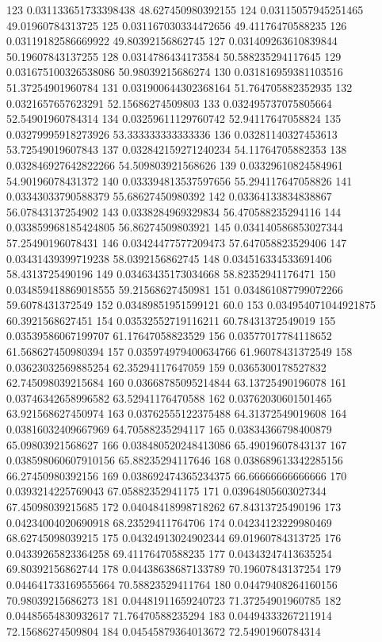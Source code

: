 {123 0.031133651733398438 48.627450980392155
124 0.03115057945251465 49.01960784313725
125 0.031167030334472656 49.41176470588235
126 0.03119182586669922 49.80392156862745
127 0.031409263610839844 50.19607843137255
128 0.0314786434173584 50.588235294117645
129 0.031675100326538086 50.98039215686274
130 0.031816959381103516 51.37254901960784
131 0.031900644302368164 51.764705882352935
132 0.0321657657623291 52.15686274509803
133 0.032495737075805664 52.54901960784314
134 0.03259611129760742 52.94117647058824
135 0.03279995918273926 53.333333333333336
136 0.03281140327453613 53.72549019607843
137 0.032842159271240234 54.11764705882353
138 0.032846927642822266 54.509803921568626
139 0.03329610824584961 54.90196078431372
140 0.033394813537597656 55.294117647058826
141 0.03343033790588379 55.68627450980392
142 0.03364133834838867 56.07843137254902
143 0.0338284969329834 56.470588235294116
144 0.033859968185424805 56.86274509803921
145 0.034140586853027344 57.25490196078431
146 0.03424477577209473 57.647058823529406
147 0.03431439399719238 58.0392156862745
148 0.034516334533691406 58.4313725490196
149 0.03463435173034668 58.82352941176471
150 0.034859418869018555 59.21568627450981
151 0.034861087799072266 59.6078431372549
152 0.03489851951599121 60.0
153 0.034954071044921875 60.3921568627451
154 0.03532552719116211 60.78431372549019
155 0.03539586067199707 61.17647058823529
156 0.03577017784118652 61.568627450980394
157 0.035974979400634766 61.96078431372549
158 0.03623032569885254 62.35294117647059
159 0.0365300178527832 62.745098039215684
160 0.03668785095214844 63.13725490196078
161 0.03746342658996582 63.52941176470588
162 0.03762030601501465 63.921568627450974
163 0.03762555122375488 64.31372549019608
164 0.03816032409667969 64.70588235294117
165 0.03834366798400879 65.09803921568627
166 0.038480520248413086 65.49019607843137
167 0.038598060607910156 65.88235294117646
168 0.038689613342285156 66.27450980392156
169 0.038692474365234375 66.66666666666666
170 0.0393214225769043 67.05882352941175
171 0.03964805603027344 67.45098039215685
172 0.04048418998718262 67.84313725490196
173 0.04234004020690918 68.23529411764706
174 0.04234123229980469 68.62745098039215
175 0.04324913024902344 69.01960784313725
176 0.04339265823364258 69.41176470588235
177 0.04343247413635254 69.80392156862744
178 0.04438638687133789 70.19607843137254
179 0.044641733169555664 70.58823529411764
180 0.04479408264160156 70.98039215686273
181 0.04481911659240723 71.37254901960785
182 0.04485654830932617 71.76470588235294
183 0.04494333267211914 72.15686274509804
184 0.04545879364013672 72.54901960784314
}
